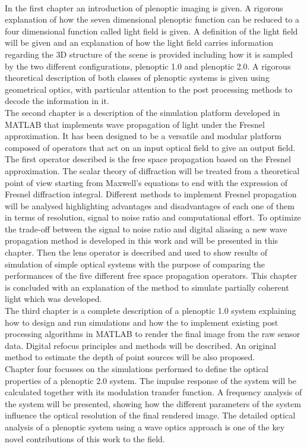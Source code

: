 \\
In the first chapter an introduction of plenoptic imaging is given. A rigorous explanation of how the seven dimensional plenoptic function can be reduced to a four dimensional function called light field is given. A definition of the light field will be given and an explanation of how the light field carries information regarding the 3D structure of the scene is provided including how it is sampled by the two different configurations, plenoptic 1.0 and plenoptic 2.0. A rigorous theoretical description of both classes of plenoptic systems is given using geometrical optics, with particular attention to the post processing methods to decode the information in it. \\
The second chapter is a description of the simulation platform developed in MATLAB that implements wave propagation of light under the Fresnel approximation. It has been designed to be a versatile and modular platform composed of operators that act on an input optical field to give an output field. The first operator described is the free space propagation based on the Fresnel approximation. The scalar theory of diffraction will be treated from a theoretical point of view starting from Maxwell's equations to end with the expression of Fresnel diffraction integral. Different methods to implement Fresnel propagation will be analysed highlighting advantages and disadvantages of each one of them in terms of resolution, signal to noise ratio and computational effort. To optimize the trade-off between the signal to noise ratio and digital aliasing a new wave propagation method is developed in this work and will be presented in this chapter. Then the lens operator is described and used to show results of simulation of simple optical systems with the purpose of comparing the performances of the five different free space propagation operators. This chapter is concluded with an explanation of the method to simulate partially coherent light which was developed.
\\
The third chapter is a complete description of a plenoptic 1.0 system explaining how to design and run simulations and how the to implement existing post processing algorithms in MATLAB to render the final image from the raw sensor data. Digital refocus principles and methods will be described. An original method to estimate the depth of point sources will be also proposed. 
\\
Chapter four focusses on the simulations performed to define the optical properties of a plenoptic 2.0 system. The impulse response of the system will be calculated together with its modulation transfer function. A frequency analysis of the system will be presented, showing how the different parameters of the system influence the optical resolution of the final rendered image. The detailed optical analysis of a plenoptic system using a wave optics approach is one of the key novel contributions of this work to the field.
